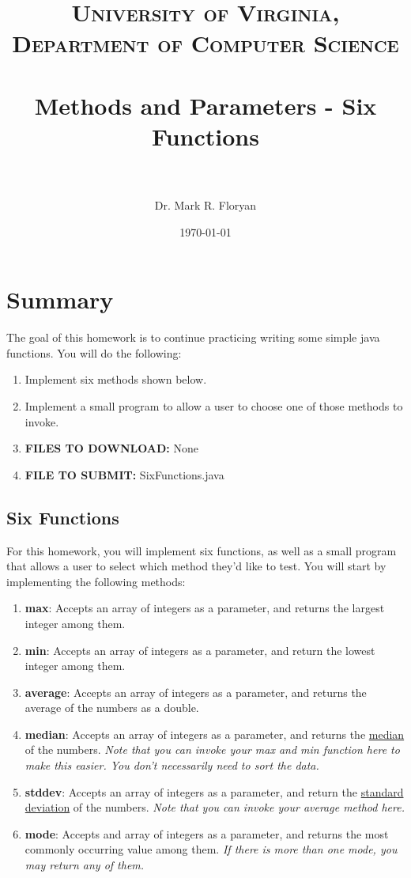 \documentclass[paper=a4, fontsize=11pt, parskip=full]{scrartcl} %
\title{	
\normalfont \normalsize 
\textsc{University of Virginia, Department of Computer Science} \\ [25pt] %
\horrule{0.5pt} \\[0.4cm] %
\huge Methods and Parameters - Six Functions \\ %
\horrule{2pt} \\[0.5cm] %
}
\author{Dr. Mark R. Floryan} %
\date{\normalsize\today} %
\numberwithin{equation}{section} %
\numberwithin{figure}{section} %
\numberwithin{table}{section} %
\begin{document}
\maketitle %

\section{Summary}

The goal of this homework is to continue practicing writing some simple java functions. You will do the following:

\begin{enumerate}
	\item Implement six methods shown below.
	\item Implement a small program to allow a user to choose one of those methods to invoke.
	\item \textbf{FILES TO DOWNLOAD:} None
	\item \textbf{FILE TO SUBMIT:} SixFunctions.java
\end{enumerate}

\subsection{Six Functions}

For this homework, you will implement six functions, as well as a small program that allows a user to select which method they'd like to test. You will start by implementing the following methods:

\begin{enumerate}
\item \textbf{max}: Accepts an array of integers as a parameter, and returns the largest integer among them.
\item \textbf{min}: Accepts an array of integers as a parameter, and return the lowest integer among them.
\item \textbf{average}: Accepts an array of integers as a parameter, and returns the average of the numbers as a double.
\item \textbf{median}: Accepts an array of integers as a parameter, and returns the \href{https://en.wikipedia.org/wiki/Median}{median} of the numbers. \emph{Note that you can invoke your max and min function here to make this easier. You don't necessarily need to sort the data.} 
\item \textbf{stddev}: Accepts an array of integers as a parameter, and return the \href{https://en.wikipedia.org/wiki/Standard_deviation}{standard deviation} of the numbers. \emph{Note that you can invoke your average method here.}
\item \textbf{mode}: Accepts and array of integers as a parameter, and returns the most commonly occurring value among them. \emph{If there is more than one mode, you may return any of them.}
\end{enumerate}
\end{document}
